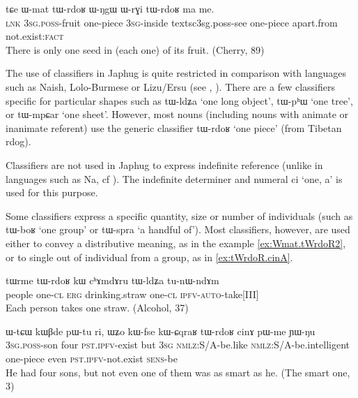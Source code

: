 \documentclass[oldfontcommands,oneside,a4paper,12pt]{article}
\newcommand{\ipa}[1]{{\phon#1}}
\begin{document}
\begin{exe}
\ex \label{ex:Wmat.tWrdoR}
\gll 
\ipa{tɕe} 	\ipa{ɯ-mat} 	\ipa{tɯ-rdoʁ} 	\ipa{ɯ-ŋgɯ} 	\ipa{ɯ-rɣi} 	\ipa{tɯ-rdoʁ} 	\ipa{ma} 	\ipa{me.} \\
\textsc{lnk} \textsc{3sg.poss}-fruit  one-piece \textsc{3sg}-inside textsc{3sg.poss}-see  one-piece apart.from not.exist:\textsc{fact} \\
\glt There is only one seed in (each one) of its fruit. (Cherry, 89)
\end{exe}

The use of classifiers in Japhug is quite restricted in comparison with languages such as Naish, Lolo-Burmese or Lizu/Ersu (see \citealt[216-224]{lidz10na}, \citealt{zhang14classifiers}). There are a few classifiers specific for particular shapes such as \ipa{tɯ-ldʑa} `one long object', \ipa{tɯ-pʰɯ} `one tree', or \ipa{tɯ-mpɕar} `one sheet'. However, most nouns (including nouns with animate or inanimate referent) use the generic classifier \ipa{tɯ-rdoʁ} `one piece' (from Tibetan \ipa{rdog}).  

Classifiers are not used in Japhug to express indefinite reference (unlike in languages such as Na, cf \citealt[206]{lidz10na}). The indefinite determiner and numeral \ipa{ci} `one, a' is used for this purpose.

Some classifiers express a specific quantity,  size or number of individuals (such as \ipa{tɯ-boʁ} `one group' or \ipa{tɯ-spra} `a handful of'). Most classifiers, however, are used either to convey a distributive meaning, as in the example \ref{ex:Wmat.tWrdoR2}, or to single out of individual from a group, as in \ref{ex:tWrdoR.cinA}.
 
\begin{exe}
\ex \label{ex:Wmat.tWrdoR2}
\gll 
\ipa{tɯrme} 	\ipa{tɯ-rdoʁ} 	\ipa{kɯ} 	\ipa{cʰɤmdɤru} 	\ipa{tɯ-ldʑa} 	\ipa{tu-nɯ-ndɤm} \\
people one-\textsc{cl} \textsc{erg} drinking.straw one-\textsc{cl} \textsc{ipfv-auto}-take[III] \\
\glt Each person takes one straw. (Alcohol, 37)
\end{exe}
 
\begin{exe}
\ex \label{ex:tWrdoR.cinA}
\gll 
\ipa{ɯ-tɕɯ} 	\ipa{kɯβde} 	\ipa{pɯ-tu} 	\ipa{ri,} 	\ipa{ɯʑo} 	\ipa{kɯ-fse} 	\ipa{kɯ-ɕqraʁ} 	\ipa{tɯ-rdoʁ} 	\ipa{cinɤ} 	\ipa{pɯ-me} 	\ipa{ɲɯ-ŋu} 	\\
\textsc{3sg.poss}-son four \textsc{pst.ipfv}-exist but \textsc{3sg} \textsc{nmlz}:S/A-be.like \textsc{nmlz}:S/A-be.intelligent one-piece even \textsc{pst.ipfv}-not.exist \textsc{sens}-be \\
\glt He had four sons, but not even one of them was as smart as he. (The smart one, 3)
\end{exe} 
 
\end{document}
